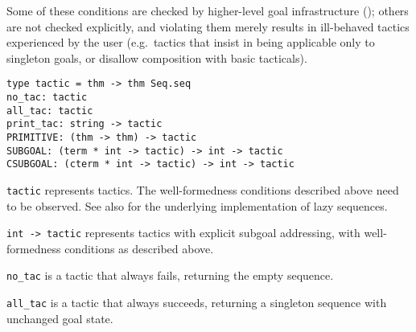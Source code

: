 \begin{isabellebody}
\begin{isamarkuptext}
  Some of these conditions are checked by higher-level goal
  infrastructure (); others are not checked
  explicitly, and violating them merely results in ill-behaved tactics
  experienced by the user (e.g.\ tactics that insist in being
  applicable only to singleton goals, or disallow composition with
  basic tacticals).%
\end{isamarkuptext}%
\isamarkuptrue%
%
\isadelimmlref
%
\endisadelimmlref
%
\isatagmlref
%
\begin{isamarkuptext}%
\begin{mldecls}
  \verb|type tactic = thm -> thm Seq.seq| \\
  \verb|no_tac: tactic| \\
  \verb|all_tac: tactic| \\
  \verb|print_tac: string -> tactic| \\[1ex]
  \verb|PRIMITIVE: (thm -> thm) -> tactic| \\[1ex]
  \verb|SUBGOAL: (term * int -> tactic) -> int -> tactic| \\
  \verb|CSUBGOAL: (cterm * int -> tactic) -> int -> tactic| \\
  \end{mldecls}

  \begin{description}

  \item \verb|tactic| represents tactics.  The well-formedness
  conditions described above need to be observed.  See also \hyperlink{file.~~/src/Pure/General/seq.ML}{\mbox{}} for the underlying implementation of
  lazy sequences.

  \item \verb|int -> tactic| represents tactics with explicit
  subgoal addressing, with well-formedness conditions as described
  above.

  \item \verb|no_tac| is a tactic that always fails, returning the
  empty sequence.

  \item \verb|all_tac| is a tactic that always succeeds, returning a
  singleton sequence with unchanged goal state.


\end{description}
\end{isamarkuptext}
\end{isabellebody}
